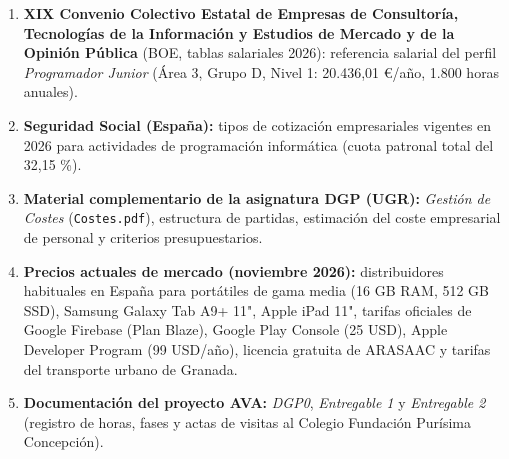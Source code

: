 \documentclass[11pt,a4paper]{article}
\begin{document}
\begin{enumerate}
  \item \textbf{XIX Convenio Colectivo Estatal de Empresas de Consultoría, Tecnologías de la Información y Estudios de Mercado y de la Opinión Pública} (BOE, tablas salariales 2026): referencia salarial del perfil \textit{Programador Junior} (Área 3, Grupo D, Nivel 1: 20.436,01 €/año, 1.800 horas anuales).
  \item \textbf{Seguridad Social (España):} tipos de cotización empresariales vigentes en 2026 para actividades de programación informática (cuota patronal total del 32,15 \%).
  \item \textbf{Material complementario de la asignatura DGP (UGR):} \textit{Gestión de Costes} (\texttt{Costes.pdf}), estructura de partidas, estimación del coste empresarial de personal y criterios presupuestarios.
  \item \textbf{Precios actuales de mercado (noviembre 2026):} distribuidores habituales en España para portátiles de gama media (16 GB RAM, 512 GB SSD), Samsung Galaxy Tab A9+ 11", Apple iPad 11", tarifas oficiales de Google Firebase (Plan Blaze), Google Play Console (25 USD), Apple Developer Program (99 USD/año), licencia gratuita de ARASAAC y tarifas del transporte urbano de Granada.
  \item \textbf{Documentación del proyecto AVA:} \textit{DGP0}, \textit{Entregable 1} y \textit{Entregable 2} (registro de horas, fases y actas de visitas al Colegio Fundación Purísima Concepción).
\end{enumerate}
\end{document}
